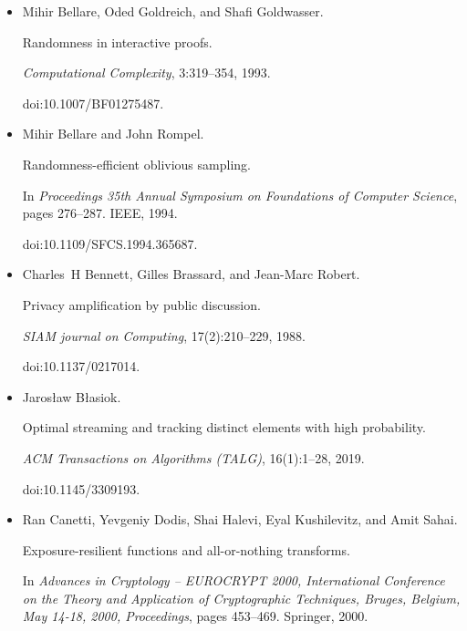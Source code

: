 \begin{itemize}
\item[] 
[5]

Mihir Bellare, Oded Goldreich, and Shafi Goldwasser.


Randomness in interactive proofs.


\emph{Computational Complexity}, 3:319–354, 1993.


doi:10.1007/BF01275487.





\item[] 
[6]

Mihir Bellare and John Rompel.


Randomness-efficient oblivious sampling.


In \emph{Proceedings 35th Annual Symposium on Foundations of Computer
Science}, pages 276–287. IEEE, 1994.


doi:10.1109/SFCS.1994.365687.





\item[] 
[7]

Charles H Bennett, Gilles Brassard, and Jean-Marc Robert.


Privacy amplification by public discussion.


\emph{SIAM journal on Computing}, 17(2):210–229, 1988.


doi:10.1137/0217014.





\item[] 
[8]

Jarosław Błasiok.


Optimal streaming and tracking distinct elements with high
probability.


\emph{ACM Transactions on Algorithms (TALG)}, 16(1):1–28, 2019.


doi:10.1145/3309193.





\item[] 
[9]

Ran Canetti, Yevgeniy Dodis, Shai Halevi, Eyal Kushilevitz, and Amit Sahai.


Exposure-resilient functions and all-or-nothing transforms.


In \emph{Advances in Cryptology – EUROCRYPT 2000, International
Conference on the Theory and Application of Cryptographic Techniques, Bruges,
Belgium, May 14-18, 2000, Proceedings}, pages 453–469. Springer, 2000.



\end{itemize}
